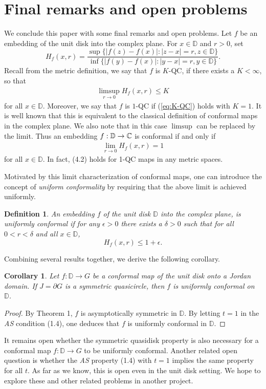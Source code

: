 \documentclass[11pt]{amsart}
\numberwithin{equation}{section}
\theoremstyle{plain}
\newtheorem{definition}{Definition}
\newtheorem{cor}{Corollary}
\theoremstyle{step}
\def\leq{\leqslant}
\newcommand{\abs}[1]{\lvert#1\rvert}
\newcommand{\D}{\mathbb{D}}
\newcommand{\C}{\Bbb{C}}
\begin{document}
\section{Final remarks and open problems}
We conclude this paper with some final remarks and open problems. Let $f$ be an embedding of the unit disk into the complex plane. For $x\in \D$ and $r>0$, set 
\[
H_f(x,r)=\frac{\sup\{\abs{f(z)-f(x)}: \abs{z-x}=r, z\in\D\}}{\inf\{\abs{f(y)-f(x)}: \abs{y-x}=r, y\in \D\}}.
\]
Recall from the metric definition, we say that $f$ is $K$-QC, if there exists a $K<\infty$, so that 
\begin{align}\label{eq:K-QC}
\limsup_{r\to 0}H_f(x,r)\leq K
\end{align}
for all $x\in \D$. Moreover, we say that $f$ is $1$-QC if (\ref{eq:K-QC}) holds with $K=1$. It is well known that this is equivalent to the classical definition of conformal maps in the complex plane. We also note that in this case $\limsup$ can be replaced by the limit. Thus an embedding $f:\D\rightarrow \C$ is conformal if and only if
\begin{align}
\lim_{r\to 0}H_f(x,r)=1   
\end{align}
for all $x\in \D$. In fact, (4.2) holds for 1-QC maps in any metric spaces.

Motivated by this limit characterization of conformal maps, one can introduce the concept of {\it uniform conformality} by requiring that the above limit is achieved uniformly. 
\begin{definition}\label{def:uniformly_conformal}
    An embedding $f$ of the unit disk $\D$ into the complex plane, is uniformly conformal if for any $\epsilon>0$ there exists a $\delta>0$ such that for all $0<r<\delta$ and all $x\in\D$,
    $$H_f(x,r)\leq 1+\epsilon.$$
\end{definition}

Combining several results together, we derive the following corollary. 
\begin{cor}\label{cor_2}
    Let $f: \D\rightarrow G$ be a conformal map of the unit disk onto a Jordan domain.
If $J=\partial G$ is a symmetric quasicircle, then $f$ is uniformly conformal on $\D$.
\end{cor}
\begin{proof} By Theorem 1, $f$ is asymptotically symmetric in $\D$. By letting $t=1$ in the {\it AS} condition (1.4), one deduces that $f$ is uniformly conformal in $\D$.
\end{proof}

It remains open whether the symmetric quasidisk property is also necessary for a conformal map $f: \D\rightarrow G$ to be uniformly conformal. Another related open question is whether the {\it AS} property (1.4) with $t=1$ implies the same property for all $t$. As far as we know, this is open even in the unit disk setting. We hope to explore these and other related problems in another project.


\end{document}
